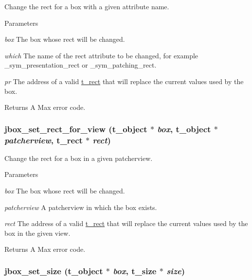 Change the rect for a box with a given attribute name. 
\begin{DoxyParams}{Parameters}
\item[{\em box}]The box whose rect will be changed. \item[{\em which}]The name of the rect attribute to be changed, for example {\ttfamily \_\-sym\_\-presentation\_\-rect} or {\ttfamily \_\-sym\_\-patching\_\-rect}. \item[{\em pr}]The address of a valid \hyperlink{structt__rect}{t\_\-rect} that will replace the current values used by the box. \end{DoxyParams}
\begin{DoxyReturn}{Returns}
A Max error code. 
\end{DoxyReturn}
\hypertarget{group__jbox_ga2e9cb5c8f8c731dc7af4d4f78ddbd387}{
\subsubsection[{jbox\_\-set\_\-rect\_\-for\_\-view}]{ jbox\_\-set\_\-rect\_\-for\_\-view ({\bf t\_\-object} $\ast$ {\em box}, \/  {\bf t\_\-object} $\ast$ {\em patcherview}, \/  {\bf t\_\-rect} $\ast$ {\em rect})}}
\label{group__jbox_ga2e9cb5c8f8c731dc7af4d4f78ddbd387}


Change the rect for a box in a given patcherview. 
\begin{DoxyParams}{Parameters}
\item[{\em box}]The box whose rect will be changed. \item[{\em patcherview}]A patcherview in which the box exists. \item[{\em rect}]The address of a valid \hyperlink{structt__rect}{t\_\-rect} that will replace the current values used by the box in the given view. \end{DoxyParams}
\begin{DoxyReturn}{Returns}
A Max error code. 
\end{DoxyReturn}
\hypertarget{group__jbox_ga09ce5b0e60e447cd40331f63ea8d7e9d}{
\subsubsection[{jbox\_\-set\_\-size}]{ jbox\_\-set\_\-size ({\bf t\_\-object} $\ast$ {\em box}, \/  {\bf t\_\-size} $\ast$ {\em size})}}
\label{group__jbox_ga09ce5b0e60e447cd40331f63ea8d7e9d}


